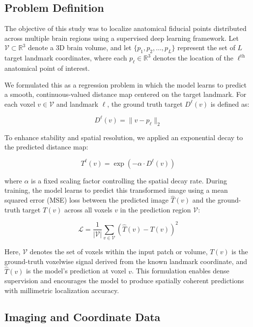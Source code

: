 \subsection{Problem Definition}
\label{sec:problemstatement}
The objective of this study was to localize anatomical fiducial points distributed across multiple brain regions using a supervised deep learning framework. Let $\mathcal{V} \subset \mathbb{R}^3$ denote a 3D brain volume, and let $\{p_1, p_2, \ldots, p_L\}$ represent the set of $L$ target landmark coordinates, where each $p_\ell \in \mathbb{R}^3$ denotes the location of the $\ell^{\text{th}}$ anatomical point of interest.

We formulated this as a regression problem in which the model learns to predict a smooth, continuous-valued distance map centered on the target landmark. For each voxel $v \in \mathcal{V}$ and landmark $\ell$, the ground truth target $D^\ell(v)$ is defined as:

\begin{equation}
D^\ell(v) = \lVert v - p_\ell \rVert_2
\end{equation}

To enhance stability and spatial resolution, we applied an exponential decay to the predicted distance map:

\begin{equation}
T^\ell(v) = \exp(-\alpha \cdot D^\ell(v))
\end{equation}

where $\alpha$ is a fixed scaling factor controlling the spatial decay rate. During training, the model learns to predict this transformed image using a mean squared error (MSE) loss between the predicted image \( \hat{T}(v) \) and the ground-truth target \( T(v) \) across all voxels \( v \) in the prediction region \( \mathcal{V} \):

\begin{equation}
\mathcal{L} = \frac{1}{|\mathcal{V}|} \sum_{v \in \mathcal{V}} \left( \hat{T}(v) - T(v) \right)^2
\end{equation}

Here, \( \mathcal{V} \) denotes the set of voxels within the input patch or volume, \( T(v) \) is the ground-truth voxelwise signal derived from the known landmark coordinate, and \( \hat{T}(v) \) is the model’s prediction at voxel \( v \). This formulation enables dense supervision and encourages the model to produce spatially coherent predictions with millimetric localization accuracy.

\subsection{Imaging and Coordinate Data}

